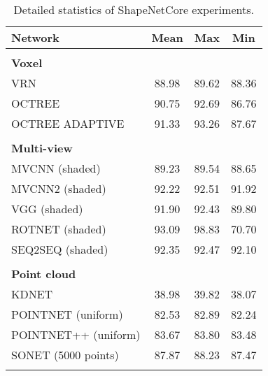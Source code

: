 \begin{table}[]
    \centering
	    \begin{tabular}{lccc}
	    	\hline
	    	\textbf{Network}       & \textbf{Mean} & \textbf{Max} & \textbf{Min} \\ \hline
	    	                       &               &              &              \\
	    	\textbf{Voxel }        &               &              &              \\
	    	VRN                    &     88.98     &    89.62     &    88.36     \\
	    	OCTREE                 &     90.75     &    92.69     &    86.76     \\
	    	OCTREE ADAPTIVE        &     91.33     &    93.26     &    87.67     \\
	    	                       &               &              &              \\
	    	\textbf{Multi-view }   &               &              &              \\
	    	MVCNN (shaded)         &     89.23     &    89.54     &    88.65     \\
	    	MVCNN2 (shaded)        &     92.22     &    92.51     &    91.92     \\
	    	VGG (shaded)           &     91.90     &    92.43     &    89.80     \\
	    	ROTNET (shaded)        &     93.09     &    98.83     &    70.70     \\
	    	SEQ2SEQ (shaded)       &     92.35     &    92.47     &    92.10     \\
	    	                       &               &              &              \\
	    	\textbf{Point cloud  } &               &              &              \\
	    	KDNET                  &     38.98     &    39.82     &    38.07     \\
	    	POINTNET (uniform)     &     82.53     &    82.89     &    82.24     \\
	    	POINTNET++ (uniform)   &     83.67     &    83.80     &    83.48     \\
	    	SONET (5000 points)    &     87.87     &    88.23     &    87.47     \\
	    	                       &               &              &              \\ \hline
	    \end{tabular}
\caption{Detailed statistics of ShapeNetCore experiments.}
\label{Table:detailss}
\end{table}

